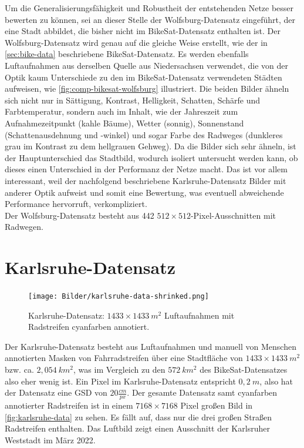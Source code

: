 Um die Generalisierungsfähigkeit und Robustheit der entstehenden Netze besser bewerten zu können, sei an dieser Stelle 
der Wolfsburg-Datensatz eingeführt, der eine Stadt abbildet, die bisher nicht im BikeSat-Datensatz enthalten ist. 
Der Wolfsburg-Datensatz wird genau auf die gleiche Weise erstellt, wie 
der in \autoref{sec:bike-data} beschriebene BikeSat-Datensatz. Es werden ebenfalls Luftaufnahmen aus derselben Quelle
aus Niedersachsen verwendet, 
die von der Optik kaum Unterschiede zu den im BikeSat-Datensatz verwendeten Städten aufweisen, wie 
\autoref{fig:comp-bikesat-wolfsburg} illustriert. Die beiden Bilder ähneln sich nicht nur in Sättigung, Kontrast,
Helligkeit, Schatten, Schärfe und Farbtemperatur, sondern auch im Inhalt, wie der Jahreszeit zum Aufnahmezeitpunkt 
(kahle Bäume), Wetter (sonnig), Sonnenstand (Schattenausdehnung und -winkel) und sogar Farbe des Radweges 
(dunkleres grau im Kontrast zu dem hellgrauen Gehweg). Da die Bilder sich sehr ähneln, ist der Hauptunterschied 
das Stadtbild, wodurch isoliert untersucht werden kann, ob dieses einen Unterschied in der Performanz der Netze macht. 
Das ist vor allem interessant, weil der nachfolgend beschriebene Karlsruhe-Datensatz Bilder mit anderer Optik 
aufweist und somit eine Bewertung, was eventuell abweichende Performance hervorruft, verkompliziert. \\ 
Der Wolfsburg-Datensatz besteht aus 442 $512{\times}512$-Pixel-Ausschnitten mit Radwegen. 

\section{Karlsruhe-Datensatz} \label{sec:karlsruhe}


\begin{figure}[h]
	\centering
	\texttt{[image: Bilder/karlsruhe-data-shrinked.png]} 
	\caption{Karlsruhe-Datensatz: $1433{\times}1433~ m^2$ Luftaufnahmen mit Radstreifen cyanfarben annotiert.}
	\label{fig:karlsruhe-data}
\end{figure} 

Der Karlsruhe-Datensatz besteht aus Luftaufnahmen und manuell von Menschen annotierten Masken von Fahrradstreifen 
über eine Stadtfläche von $1433{\times}1433~ m^2$ bzw. ca. $2,054~ km^2$, was im Vergleich zu den 
$572~ km^2$ des BikeSat-Datensatzes also eher wenig ist. Ein Pixel im Karlsruhe-Datensatz entspricht $0,2~m$, 
also hat der Datensatz eine GSD von $20 \frac{cm}{px}$.
Der gesamte Datensatz samt cyanfarben annotierter Radstreifen ist in einem 
$7168{\times}7168$ Pixel großen Bild in \autoref{fig:karlsruhe-data} zu sehen. Es fällt auf, 
dass nur die drei großen Straßen Radstreifen enthalten. Das Luftbild zeigt einen Ausschnitt der Karlsruher Weststadt im März 2022. 


